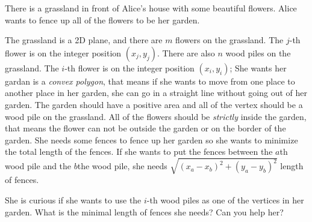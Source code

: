 There is a grassland in front of Alice's house with some beautiful flowers.
Alice wants to fence up all of the flowers to be her garden.

The grassland is a 2D plane, and there are $m$ flowers on the grassland.
The $j$-th flower is on the integer position $(x_j,y_j)$.
There are also $n$  wood piles on the grassland.
The $i$-th flower is on the integer position $(x_i,y_i)$;
She wants her gardan is a \emph{convex polygon}, 
that means if she wants to move from one place to another place in her garden, 
she can go in a straight line without going out of her garden.
The garden should have a positive area and all of the vertex should be a  wood pile on the grassland.
All of the flowers should be \emph{strictly} inside the garden, 
that means the flower can not be outside the garden or on the border of the garden.
She needs some fences to fence up her garden so she wants to minimize the total length of the fences.
If she wants to put the fences between the $a$th  wood pile and the $b$the  wood pile, she needs $\sqrt{(x_a-x_b)^2+(y_a-y_b)^2}$ length of fences.

She is curious if she wants to use the $i$-th  wood piles as one of the vertices in her garden.
What is the minimal length of fences she needs? Can you help her?

